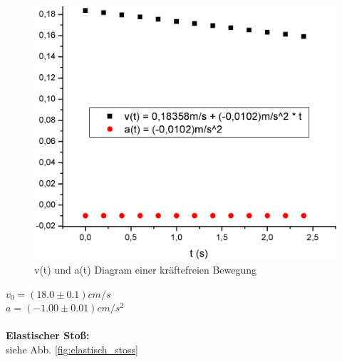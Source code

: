 \documentclass[12pt,a4paper]{article}
\begin{document}
\begin{multicols}{2}



\begin{figure}[H]
	\centering
	\includegraphics[scale=0.25]{./figure/v(t)_a(t)_diagram_freie_bew.png}
	\caption{v(t) und a(t) Diagram einer kräftefreien Bewegung}
	\label{fig:v_t_a_t_freie_bew}
\end{figure}


\noindent $v_0 =(18.0\pm 0.1)cm/s$\\
$a=(-1.00 \pm 0.01)cm/s^2$\\
\\











\noindent \textbf{Elastischer Stoß:}\\

siehe Abb. \ref{fig:elastisch_stoss}


\end{multicols}
\end{document}
